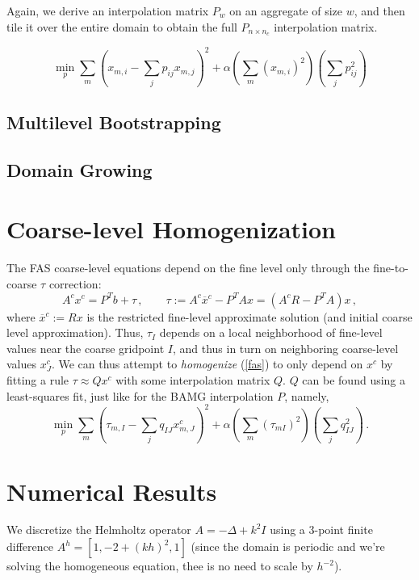 \documentclass{article}
\begin{document}
Again, we derive an interpolation matrix $P_w$ on an aggregate of size $w$, and then tile it over the entire domain to obtain the full $P_{n \times n_c}$ interpolation matrix.

\begin{equation}
	\min_p \sum_m \left( x_{m,i} - \sum_j p_{ij} x_{m,j} \right)^2 + \alpha \left( \sum_m (x_{m,i})^2 \right) \left(\sum_j p_{ij}^2\right) 
\end{equation}

\subsection{Multilevel Bootstrapping}

\subsection{Domain Growing}

\section{Coarse-level Homogenization}
The FAS coarse-level equations depend on the fine level only through the fine-to-coarse $\tau$ correction:
\begin{equation}
	A^c x^c = P^T b + \tau\,,\qquad \tau :=  A^c \overline{x}^c - P^T A x = (A^c R - P^T A) x\,,
	\label{fas}
\end{equation}
where $\overline{x}^c := R x$ is the restricted fine-level approximate solution (and initial coarse level approximation). Thus, $\tau_I$ depends on a local neighborhood of fine-level values near the coarse gridpoint $I$, and thus in turn on neighboring coarse-level values $x^c_J$. We can thus attempt to \emph{homogenize} (\ref{fas}) to only depend on $x^c$  by fitting a rule $\tau \approx Q x^c$ with some interpolation matrix $Q$. $Q$ can be found using a least-squares fit, just like for the BAMG interpolation $P$, namely,
\begin{equation}
	\min_p \sum_m \left( \tau_{m,I} - \sum_j q_{IJ} x^c_{m,J} \right)^2 + \alpha \left( \sum_m (\tau_{mI})^2 \right) \left(\sum_j q_{IJ}^2\right) \,.
\end{equation}

\section{Numerical Results}
We discretize the Helmholtz operator $A = -\Delta + k^2 I$ using a $3$-point finite difference $A^h = [1, -2 + (kh)^2, 1]$ (since the domain is periodic and we're solving the homogeneous equation, thee is no need to scale by $h^{-2}$).
\end{document}
